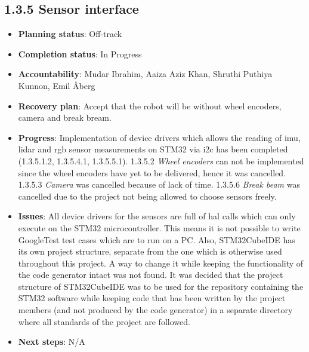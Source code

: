 \subsection*{1.3.5 Sensor interface}
\begin{itemize}
    \item \textbf{Planning status}: Off-track
    \item \textbf{Completion status}: In Progress
    \item \textbf{Accountability}: Mudar Ibrahim, Aaiza Aziz Khan, Shruthi Puthiya Kunnon, Emil Åberg
    \item \textbf{Recovery plan}: Accept that the robot will be without wheel encoders, camera and break bream.
    \item \textbf{Progress}: Implementation of device drivers which allows the reading of \ac{imu}, \ac{lidar} and \ac{rgb} sensor measurements on STM32 via \ac{i2c} has been completed (1.3.5.1.2, 1.3.5.4.1, 1.3.5.5.1). 1.3.5.2 \textit{Wheel encoders} can not be implemented since the wheel encoders have yet to be delivered, hence it was cancelled. 1.3.5.3 \textit{Camera} was cancelled because of lack of time. 1.3.5.6 \textit{Break beam} was cancelled due to the project not being allowed to choose sensors freely.
    \item \textbf{Issues}: All device drivers for the sensors are full of \ac{hal} calls which can only execute on the STM32 microcontroller. This means it is not possible to write GoogleTest test cases which are to run on a PC. Also, STM32CubeIDE has its own project structure, separate from the one which is otherwise used throughout this project. A way to change it while keeping the functionality of the code generator intact was not found. It was decided that the project structure of STM32CubeIDE was to be used for the repository containing the STM32 software while keeping code that has been written by the project members (and not produced by the code generator) in a separate directory where all standards of the project are followed.
    \item \textbf{Next steps}: N/A
\end{itemize}


